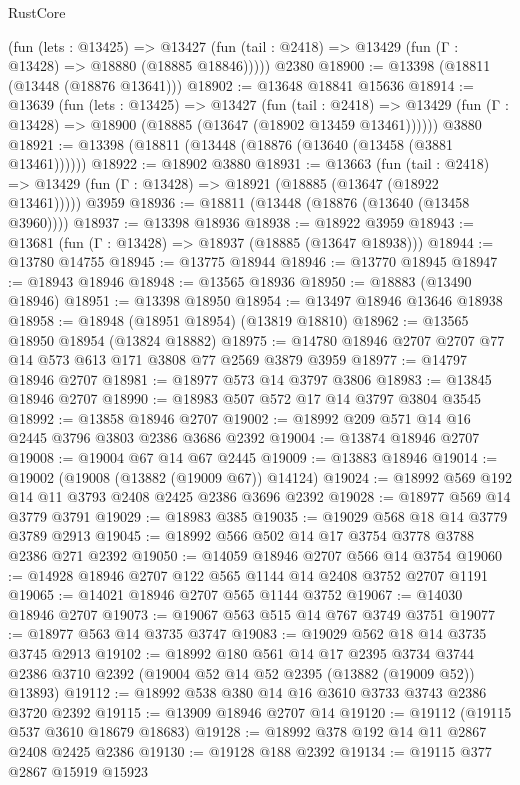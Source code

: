 \begin{lexlean}{RustCore}
\begin{coremodule}
      (fun (lets : @13425) =>
      @13427 (fun (tail : @2418) => @13429 (fun (Γ : @13428) => @18880 (@18885 @18846)))))
    @2380
@18900 := @13398 (@18811 (@13448 (@18876 @13641)))
@18902 := @13648 @18841 @15636
@18914 := @13639
    (fun (lets : @13425) =>
    @13427
      (fun (tail : @2418) =>
      @13429 (fun (Γ : @13428) => @18900 (@18885 (@13647 (@18902 @13459 @13461))))))
    @3880
@18921 := @13398 (@18811 (@13448 (@18876 (@13640 (@13458 (@3881 @13461))))))
@18922 := @18902 @3880
@18931 := @13663
    (fun (tail : @2418) => @13429 (fun (Γ : @13428) => @18921 (@18885 (@13647 (@18922 @13461)))))
    @3959
@18936 := @18811 (@13448 (@18876 (@13640 (@13458 @3960))))
@18937 := @13398 @18936
@18938 := @18922 @3959
@18943 := @13681 (fun (Γ : @13428) => @18937 (@18885 (@13647 @18938)))
@18944 := @13780 @14755
@18945 := @13775 @18944
@18946 := @13770 @18945
@18947 := @18943 @18946
@18948 := @13565 @18936
@18950 := @18883 (@13490 @18946)
@18951 := @13398 @18950
@18954 := @13497 @18946 @13646 @18938
@18958 := @18948 (@18951 @18954) (@13819 @18810)
@18962 := @13565 @18950 @18954 (@13824 @18882)
@18975 := @14780 @18946 @2707 @2707 @77 @14 @573 @613 @171 @3808 @77 @2569 @3879 @3959
@18977 := @14797 @18946 @2707
@18981 := @18977 @573 @14 @3797 @3806
@18983 := @13845 @18946 @2707
@18990 := @18983 @507 @572 @17 @14 @3797 @3804 @3545
@18992 := @13858 @18946 @2707
@19002 := @18992 @209 @571 @14 @16 @2445 @3796 @3803 @2386 @3686 @2392
@19004 := @13874 @18946 @2707
@19008 := @19004 @67 @14 @67 @2445
@19009 := @13883 @18946
@19014 := @19002 (@19008 (@13882 (@19009 @67)) @14124)
@19024 := @18992 @569 @192 @14 @11 @3793 @2408 @2425 @2386 @3696 @2392
@19028 := @18977 @569 @14 @3779 @3791
@19029 := @18983 @385
@19035 := @19029 @568 @18 @14 @3779 @3789 @2913
@19045 := @18992 @566 @502 @14 @17 @3754 @3778 @3788 @2386 @271 @2392
@19050 := @14059 @18946 @2707 @566 @14 @3754
@19060 := @14928 @18946 @2707 @122 @565 @1144 @14 @2408 @3752 @2707 @1191
@19065 := @14021 @18946 @2707 @565 @1144 @3752
@19067 := @14030 @18946 @2707
@19073 := @19067 @563 @515 @14 @767 @3749 @3751
@19077 := @18977 @563 @14 @3735 @3747
@19083 := @19029 @562 @18 @14 @3735 @3745 @2913
@19102 := @18992
    @180
    @561
    @14
    @17
    @2395
    @3734
    @3744
    @2386
    @3710
    @2392
    (@19004 @52 @14 @52 @2395 (@13882 (@19009 @52)) @13893)
@19112 := @18992 @538 @380 @14 @16 @3610 @3733 @3743 @2386 @3720 @2392
@19115 := @13909 @18946 @2707 @14
@19120 := @19112 (@19115 @537 @3610 @18679 @18683)
@19128 := @18992 @378 @192 @14 @11 @2867 @2408 @2425 @2386
@19130 := @19128 @188 @2392
@19134 := @19115 @377 @2867 @15919 @15923

\end{coremodule}
\end{lexlean}
